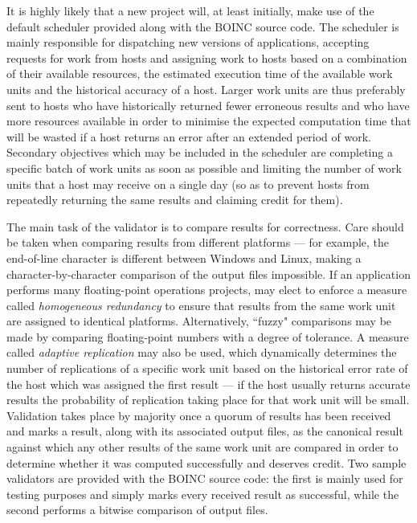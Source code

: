 It is highly likely that a new project will, at least initially, make use of the default scheduler  provided along  with the BOINC source code.
The scheduler is  mainly responsible for dispatching new versions of applications, accepting requests for work from hosts and assigning work to hosts based on a combination of their available resources, the estimated execution time of the available work units and the historical accuracy of a host. Larger work units are thus preferably sent to hosts who have  historically returned fewer erroneous results and who have more resources available in order to minimise the expected computation time that will be wasted if a host returns an error after an extended period of   work.
Secondary objectives which may be included in the scheduler are completing a specific batch of work units as soon as possible and limiting the number of work units that a host may receive on a single day (so as to prevent hosts from repeatedly returning the same results and claiming credit for them).

The main task of the validator is to compare results for correctness. Care should be taken when comparing results from different platforms --- for example, the end-of-line character is different between Windows and Linux, making a character-by-character comparison of the output files impossible. If an application performs many floating-point operations projects, may elect to enforce a measure called \emph{homogeneous redundancy} to ensure that results from the same work unit are assigned to identical platforms. Alternatively,  ``fuzzy" comparisons may be made by comparing floating-point numbers with a degree of tolerance. A measure called \emph{adaptive replication} may also be used, which dynamically determines the number of replications of a specific work unit based on the historical error rate of the host which was assigned the first result --- if the host usually returns accurate results the probability of replication taking place for that work unit will be small.
Validation takes place by majority once a quorum of results has been received and marks a result, along with its associated output files, as the canonical result against which any other results of the same work unit are compared in order to determine whether it was computed successfully and deserves credit.
Two sample validators are provided with the BOINC source code: the first is mainly used for testing purposes and simply marks every received result as successful, while the second performs a bitwise comparison of output files.

